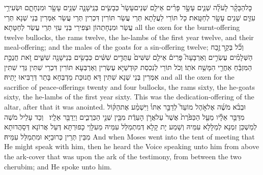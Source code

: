 {כׇּל\maqqaf הַבָּקָ֨ר לָעֹלָ֜ה שְׁנֵ֧ים עָשָׂ֣ר פָּרִ֗ים אֵילִ֤ם שְׁנֵים\maqqaf עָשָׂר֙ כְּבָשִׂ֧ים בְּנֵֽי\maqqaf שָׁנָ֛ה שְׁנֵ֥ים עָשָׂ֖ר וּמִנְחָתָ֑ם וּשְׂעִירֵ֥י עִזִּ֛ים שְׁנֵ֥ים עָשָׂ֖ר לְחַטָּֽאת׃}
{כָּל תּוֹרֵי לַעֲלָתָא תְּרֵי עֲשַׂר תּוֹרִין דִּכְרִין תְּרֵי עֲשַׂר אִמְּרִין בְּנֵי שְׁנָא תְּרֵי עֲשַׂר וּמִנְחָתְהוֹן וּצְפִירֵי בְּנֵי עִזֵּי תְּרֵי עֲשַׂר לְחַטָּתָא׃}
{all the oxen for the burnt-offering twelve bullocks, the rams twelve, the he-lambs of the first year twelve, and their meal-offering; and the males of the goats for a sin-offering twelve;}{}
{וְכֹ֞ל בְּקַ֣ר \legarmeh  זֶ֣בַח הַשְּׁלָמִ֗ים עֶשְׂרִ֣ים וְאַרְבָּעָה֮ פָּרִים֒ אֵילִ֤ם שִׁשִּׁים֙ עַתֻּדִ֣ים שִׁשִּׁ֔ים כְּבָשִׂ֥ים בְּנֵי\maqqaf שָׁנָ֖ה שִׁשִּׁ֑ים זֹ֚את חֲנֻכַּ֣ת הַמִּזְבֵּ֔חַ אַחֲרֵ֖י הִמָּשַׁ֥ח אֹתֽוֹ׃}
{וְכֹל תּוֹרֵי לְנִכְסַת קוּדְשַׁיָּא עֶשְׂרִין וְאַרְבְּעָא תּוֹרִין דִּכְרֵי שִׁתִּין גְּדֵי שִׁתִּין אִמְּרִין בְּנֵי שְׁנָא שִׁתִּין דָּא חֲנוּכַּת מַדְבְּחָא בָּתַר דְּרַבִּיאוּ יָתֵיהּ׃}
{and all the oxen for the sacrifice of peace-offerings twenty and four bullocks, the rams sixty, the he-goats sixty, the he-lambs of the first year sixty. This was the dedication-offering of the altar, after that it was anointed.}{}
{וּבְבֹ֨א מֹשֶׁ֜ה אֶל\maqqaf אֹ֣הֶל מוֹעֵד֮ לְדַבֵּ֣ר אִתּוֹ֒ וַיִּשְׁמַ֨ע אֶת\maqqaf הַקּ֜וֹל מִדַּבֵּ֣ר אֵלָ֗יו מֵעַ֤ל הַכַּפֹּ֙רֶת֙ אֲשֶׁר֙ עַל\maqqaf אֲרֹ֣ן הָעֵדֻ֔ת מִבֵּ֖ין שְׁנֵ֣י הַכְּרֻבִ֑ים וַיְדַבֵּ֖ר אֵלָֽיו׃ \petucha }
{וְכַד עָלֵיל מֹשֶׁה לְמַשְׁכַּן זִמְנָא לְמַלָּלָא עִמֵּיהּ וְשָׁמַע יָת קָלָא דְּמִתְמַלַּל עִמֵּיהּ מֵעִלָּוֵי כָפוּרְתָּא דְּעַל אֲרוֹנָא דְּסָהֲדוּתָא מִבֵּין תְּרֵין כְּרוּבַיָּא וּמִתְמַלַּל עִמֵּיהּ׃}
{And when Moses went into the tent of meeting that He might speak with him, then he heard the Voice speaking unto him from above the ark-cover that was upon the ark of the testimony, from between the two cherubim; and He spoke unto him.}{}
